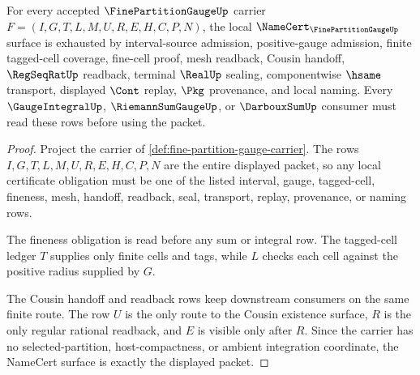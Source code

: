\begin{theorem}
\label{thm:fine-partition-gauge-namecert-obligations}
For every accepted $\FinePartitionGaugeUp$ carrier $F=(I,G,T,L,M,U,R,E,H,C,P,N)$, the local $\NameCert_{\FinePartitionGaugeUp}$ surface is exhausted by interval-source admission, positive-gauge admission, finite tagged-cell coverage, fine-cell proof, mesh readback, Cousin handoff, $\RegSeqRatUp$ readback, terminal $\RealUp$ sealing, componentwise $\hsame$ transport, displayed $\Cont$ replay, $\Pkg$ provenance, and local naming. Every $\GaugeIntegralUp$, $\RiemannSumGaugeUp$, or $\DarbouxSumUp$ consumer must read these rows before using the packet.
\end{theorem}
\begin{proof}
Project the carrier of \autoref{def:fine-partition-gauge-carrier}. The rows $I,G,T,L,M,U,R,E,H,C,P,N$ are the entire displayed packet, so any local certificate obligation must be one of the listed interval, gauge, tagged-cell, fineness, mesh, handoff, readback, seal, transport, replay, provenance, or naming rows.

The fineness obligation is read before any sum or integral row. The tagged-cell ledger $T$ supplies only finite cells and tags, while $L$ checks each cell against the positive radius supplied by $G$.

The Cousin handoff and readback rows keep downstream consumers on the same finite route. The row $U$ is the only route to the Cousin existence surface, $R$ is the only regular rational readback, and $E$ is visible only after $R$. Since the carrier has no selected-partition, host-compactness, or ambient integration coordinate, the NameCert surface is exactly the displayed packet.
\end{proof}

